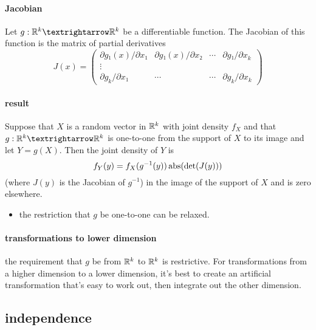 \paragraph{Jacobian}
      Let $g: \RR^k → \RR^k$ be a differentiable function.  The
      Jacobian of this function is the matrix of partial derivatives
      \[ J(x) =
      \begin{pmatrix} ∂g₁(x)/∂x₁ & ∂g₁(x)/∂x₂ & ⋯ & ∂g₁/∂x_k \\
      ⋮ \\
      ∂g_k/∂x₁ & ⋯ & ⋯ & ∂g_k/∂x_k
      \end{pmatrix} \]

\paragraph{result \citep[B.7.7]{Gre_2011}}
Suppose that $X$ is a random vector in $\mathbb{R}^k$ with joint density
$f_X$ and that $g: \RR^k → \RR^k$ is one-to-one from the support of
$X$ to its image and let $Y = g(X)$.  Then the joint density of $Y$ is
\[ f_Y(y) = f_X(g^{-1}(y)) \operatorname{abs}(\det( J(y) ))\]
(where $J(y)$ is the Jacobian of $g^{-1}$) in the image of the support
of $X$ and is zero elsewhere.
\begin{itemize}
\item the restriction that $g$ be one-to-one can be relaxed.
\end{itemize}

\paragraph{transformations to lower dimension}
      the requirement that $g$ be from $\mathbb{R}^k$ to $\mathbb{R}^k$ is restrictive.
      For transformations from a higher dimension to a lower dimension,
      it's best to create an artificial transformation that's easy to
      work out, then integrate out the other dimension.

\subsection{independence}

